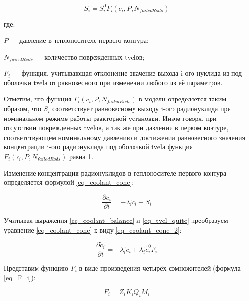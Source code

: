 \begin{equation}
    \label{eq_tvel_quite}
    S_{i} = S_{i}^{0}F_{i}(c_{i}, P, N_{failedRods})
\end{equation}

где:
\begin{description}
    \item $P$ --- давление в теплоносителе первого контура;
    \item $N_{failedRods}$ --- количество поврежденных \ac{tvel}ов;
    \item $F_{i}$ --- функция, учитывающая отклонение значение выхода i-ого нуклида из-под оболочки \ac{tvel}а от 
        равновесного при изменении любого из её параметров.
\end{description}

Отметим, что функция $F_{i}(c_{i}, P, N_{failedRods})$ в модели определяется таким образом, что $S_{i}$ соответствует 
равновесному выходу i-ого радионуклида при номинальном режиме работы реакторной установки. Иначе говоря, при отсутствии 
поврежденных \ac{tvel}ов, а так же при давлении в первом контуре, соответствующем номинальному давлению и достижении 
равновесного значения концентрации i-ого радионуклида под оболочкой \ac{tvel}а функция $F_{i}(c_{i}, P, N_{failedRods})$ 
равна 1.

Изменение концентрации радионуклидов в теплоносителе первого контура определяется формулой \ref{eq_coolant_conc}:

\begin{equation}
    \label{eq_coolant_conc}
    \frac{\partial \widetilde{c}_{i}}{\partial t} = -\lambda_{i}\widetilde{c}_{i} + S_{i}
\end{equation}

Учитывая выражения \ref{eq_coolant_balance} и \ref{eq_tvel_quite} преобразуем уравнение \ref{eq_coolant_conc} к виду 
\ref{eq_coolant_conc_2}:

\begin{equation}
    \label{eq_coolant_conc_2}
    \frac{\partial \widetilde{c}_{i}}{\partial t} = -\lambda_{i}\widetilde{c}_{i} + \lambda_{i}\widetilde{c}_{i}^{0}F_{i}
\end{equation}

Представим функцию $F_{i}$ в виде произведения четырёх сомножителей (формула \ref{eq_F_i}):

\begin{equation}
    \label{eq_F_i}
    F_{i} = Z_{i}K_{i}Q_{i}M_{i}
\end{equation}


